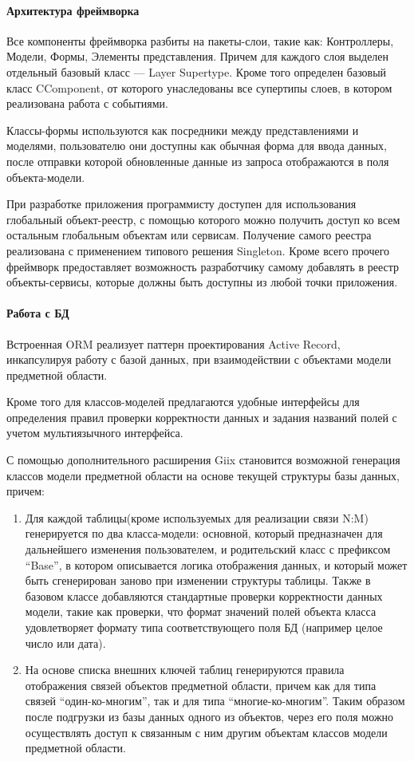 \paragraph{Архитектура фреймворка}
Все компоненты фреймворка разбиты на пакеты-слои, такие как: Контроллеры, Модели, Формы, 
Элементы представления. Причем для каждого слоя выделен отдельный базовый класс ---
 Layer Supertype\cite{fowler}. Кроме того определен базовый класс CComponent, от которого
унаследованы все супертипы слоев, в котором реализована работа с событиями.

Классы-формы используются как посредники между представлениями и моделями, пользователю
они доступны как обычная форма для ввода данных, после отправки которой обновленные данные
из запроса отображаются в поля объекта-модели.

При разработке приложения программисту доступен для использования глобальный объект-реестр,
с помощью которого можно получить доступ ко всем остальным глобальным объектам или сервисам.
Получение самого реестра реализована с применением типового решения Singleton\cite{gamma}.
Кроме всего прочего фреймворк предоставляет возможность разработчику самому добавлять в реестр
объекты-сервисы, которые должны быть доступны из любой точки приложения. 

\paragraph{Работа с БД}Встроенная ORM реализует паттерн проектирования Active Record\cite{fowler},
инкапсулируя работу с базой данных, при взаимодействии с объектами модели предметной области.

Кроме того для классов-моделей предлагаются удобные интерфейсы для определения правил проверки
корректности данных и задания названий полей с учетом мультиязычного интерфейса.

С помощью дополнительного расширения Giix\cite{giix} становится возможной генерация классов модели предметной
области на основе текущей структуры базы данных, причем:
\begin{enumerate}
\item{
  Для каждой таблицы(кроме используемых для реализации связи N:M) генерируется по два класса-модели:
  основной, который предназначен для дальнейшего изменения пользователем, и родительский класс 
  с префиксом ``Base'', в котором описывается логика отображения данных, и который может быть
  сгенерирован заново при изменении структуры таблицы. Также в базовом классе добавляются
  стандартные проверки корректности данных модели, такие как проверки, что формат значений полей объекта
  класса удовлетворяет формату типа соответствующего поля БД (например целое число или дата).
}
\item{
  На основе списка внешних ключей таблиц генерируются правила отображения связей объектов предметной области, 
  причем как для типа связей ``один-ко-многим'', так и для типа ``многие-ко-многим''.
  Таким образом после подгрузки из базы данных одного из объектов, через его поля можно осуществлять доступ
  к связанным с ним другим объектам классов модели предметной области.
}
\end{enumerate}

